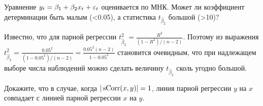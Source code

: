 \documentclass[pdftex,11pt,openany]{book}\usepackage[]{graphicx}\usepackage[]{color}
\begin{document}
\begin{problem}
Уравнение $y_t = \beta_1 + \beta_2 x_t + \varepsilon_t$ оценивается по МНК. Может ли коэффициент детерминации быть малым (<0.05), а статистика $t_{\hat{\beta}_2}$ большой (>10)?
\end{problem}

\begin{solution}
Известно, что для парной регрессии $t_{\hat{\beta}_2}^2 = \frac{R^2}{(1 - R^2)/(n-2)}$. Поэтому из выражения $t_{\hat{\beta}_2}^2 = \frac{0.05^2}{(1 - 0.05^2)/(n-2)} = \frac{0.05^2 (n-2)}{1 - 0.05^2}$ становится очевидным, что при надлежащем выборе числа наблюдений можно сделать величину $t_{\hat{\beta}_2}$ сколь угодно большой.
\end{solution}


\begin{problem}
 Докажите, что в случае, когда $|\operatorname{sCorr}(x, y)| = 1$, линия парной регрессии $y$ на $x$ совпадает с линией парной регрессии $x$ на $y$.
\end{problem}
\end{document}
